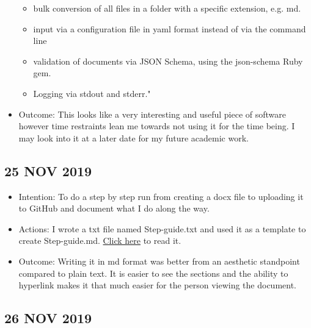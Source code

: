 \documentclass{article}
\begin{document}
\begin{itemize}
\begin{itemize}
        \item bulk conversion of all files in a folder with a specific extension, e.g. md.
        \item input via a configuration file in yaml format instead of via the command line
        \item validation of documents via JSON Schema, using the json-schema Ruby gem.
        \item Logging via stdout and stderr."
    \end{itemize}
    \item Outcome: This looks like a very interesting and useful piece of software however time restraints lean me towards not using it for the time being. I may look into it at a later date for my future academic work.
\end{itemize}

\subsection{25 NOV 2019}

\begin{itemize}

    \item Intention: To do a step by step run from creating a docx file to uploading it to GitHub and document what I do along the way.

    \item Actions: I wrote a txt file named Step-guide.txt and used it as a template to create Step-guide.md. \href{https://github.com/MQ-FOAR705/Version-Control-Supervisor-Feedback-PoC/blob/master/Step-guide.md}{Click here} to read it.
    
    \item Outcome: Writing it in md format was better from an aesthetic standpoint compared to plain text. It is easier to see the sections and the ability to hyperlink makes it that much easier for the person viewing the document.

\end{itemize}

\subsection{26 NOV 2019}
\end{document}
